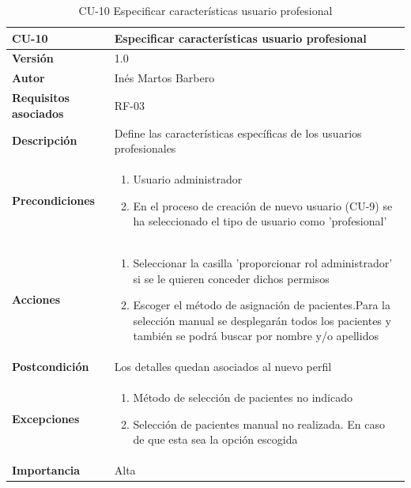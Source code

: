 \begin{table}[p]
	\centering
	\begin{tabularx}{\linewidth}{ p{} p{} }
		\toprule
		\textbf{CU-10}    & \textbf{Especificar características usuario profesional}\\
		\toprule
		\textbf{Versión}              & 1.0    \\
		\textbf{Autor}                & Inés Martos Barbero \\
		\textbf{Requisitos asociados} & RF-03 \\
		\textbf{Descripción}          & Define las características específicas de los usuarios profesionales \\
		\textbf{Precondiciones}         & 
            \begin{enumerate}
    			\def\labelenumi{\arabic{enumi}.}
    			\tightlist
    			\item Usuario administrador
    			\item En el proceso de creación de nuevo usuario (CU-9) se ha seleccionado el tipo de usuario como 'profesional'
    		\end{enumerate}\\
		\textbf{Acciones}             &
    		\begin{enumerate}
    			\def\labelenumi{\arabic{enumi}.}
    			\tightlist
    			\item Seleccionar la casilla 'proporcionar rol administrador' si se le quieren conceder dichos permisos
    			\item Escoger el método de asignación de pacientes.Para la selección manual se desplegarán todos los pacientes y también se podrá buscar por nombre y/o apellidos
    		\end{enumerate}\\
		\textbf{Postcondición}        & Los detalles quedan asociados al nuevo perfil \\
		\textbf{Excepciones}          & 
            \begin{enumerate}
    			\def\labelenumi{\arabic{enumi}.}
    			\tightlist
    			\item Método de selección de pacientes no indicado
    			\item Selección de pacientes manual no realizada. En caso de que esta sea la opción escogida
    		\end{enumerate}\\
		\textbf{Importancia}          & Alta\\
		\bottomrule
	\end{tabularx}
	\caption{CU-10 Especificar características usuario profesional}
    \label{CU-10}
\end{table}

